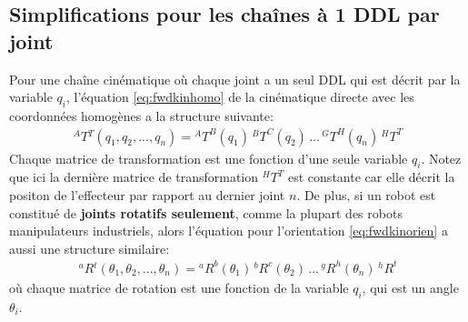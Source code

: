 \subsection{Simplifications pour les chaînes à 1 DDL par joint}
%
Pour une chaîne cinématique où chaque joint a un seul DDL qui est décrit par la variable $q_i$, l'équation \eqref{eq:fwdkinhomo} de la cinématique directe avec les coordonnées homogènes a la structure suivante:
\begin{align}
{}^AT{}^T(q_1, q_2, ..., q_n) = {}^AT^B(q_1) \,  {}^BT^C(q_2) \, ... \, {}^GT^H(q_n) \, {}^HT^T
\end{align} 
Chaque matrice de transformation est une fonction d'une seule variable $q_i$. Notez que ici la dernière matrice de transformation ${}^HT^T$ est constante car elle décrit la positon de l'effecteur par rapport au dernier joint $n$.
%
De plus, si un robot est constitué de \textbf{joints rotatifs seulement}, comme la plupart des robots manipulateurs industriels, alors l'équation pour l'orientation \eqref{eq:fwdkinorien} a aussi une structure similaire:
\begin{align}
{}^aR{}^t(\theta_1, \theta_2, ..., \theta_n) =  {}^aR^b(\theta_1) \,  {}^bR^c(\theta_2) \, ... \, {}^gR^h(\theta_n) \, {}^hR^t
\end{align} 
où chaque matrice de rotation est une fonction de la variable $q_i$, qui est un angle $\theta_i$.

